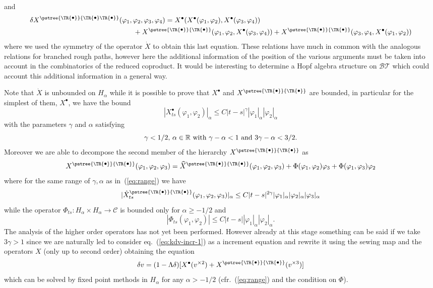 \documentclass[a4paper]{article}
\newcommand{\1}{{\bf 1}}
\newcommand{\der}{\delta}
\newcommand{\RR}{\mathbb{R}}
\newcommand{\CC}{\mathcal{C}}
\newcommand{\BT}{\mathcal{BT}}
\newcommand{\troot}{\bullet}
\newcommand{\tsnode}{\TR{\raisebox{0.5pt}{\ensuremath{\scriptstyle\bullet}}}}
\newcommand{\tsroot}{\ensuremath{\scriptstyle\bullet}}
\newcommand{\aabb}{\pstree{\tsnode}{\tsnode}}
\newcommand{\aababb}{\pstree{\tsnode}{\tsnode \tsnode}}
\newcommand{\CC}{\mathcal{C}}
\newcommand{\RR}{\mathbb{R}}
\newcommand{\der}{\delta}
\begin{document}
and
\begin{equation*}
  \begin{split}
\der X^{\aababb}& (\varphi_1,\varphi_2,\varphi_3,\varphi_4) =
X^{\tsroot}(X^{\tsroot}(\varphi_1,\varphi_2),X^{\tsroot}(\varphi_3,\varphi_4))
\\ & \qquad +
X^{\aabb}(\varphi_1,\varphi_2,X^{\tsroot}(\varphi_3,\varphi_4)) + 
X^{\aabb}(\varphi_3,\varphi_4,X^{\tsroot}(\varphi_1,\varphi_2))    
  \end{split}
\end{equation*}
where we used the symmetry of the operator $\dot X$ to obtain this
last equation. These relations have much in common with the analogous
relations for branched rough paths, however here the additional
information of the position of the various arguments must be taken
into account in the combinatorics of the reduced coproduct. It would
be interesting to determine  a Hopf algebra structure  on $\BT$
which could account this additional information in a general way. 

Note that $\dot X$ is unbounded on $H_\alpha$ while
it is possible to prove that $X^{\troot}$ and $X^{\aabb}$ are bounded,
in particular for the simplest of them, $X^\troot$, we have the bound
$$
|X^{\troot}_{ts}(\varphi_1,\varphi_2)|_\alpha \le C |t-s|^\gamma
|\varphi_1|_\alpha |\varphi_2|_\alpha 
$$
with the parameters $\gamma$ and $\alpha$ satisfying
\begin{equation}
  \label{eq:range}
\text{$ \gamma < 1/2$, $\alpha \in \RR$ with $\gamma-\alpha< 1$ and
$3 \gamma-\alpha<3/2$.}
\end{equation}
Moreover we are able to decompose the second member of the hierarchy
$X^{\aabb}$ as 
\begin{equation}
\label{eq:decomp-kdv-2}
X^{\aabb}(\varphi_1,\varphi_2,\varphi_3)  = {\widehat X}^{\aabb}(\varphi_1,\varphi_2,\varphi_3)+\Phi(\varphi_1,\varphi_2)\varphi_3+\Phi(\varphi_1,\varphi_3)\varphi_2
\end{equation}
where for the same range of $\gamma,\alpha$ as in~(\ref{eq:range}) we have
$$
|\hat X^{\aabb}_{ts}(\varphi_1,\varphi_2,\varphi_3)|_\alpha \le C |t-s|^{2\gamma}
|\varphi_1|_\alpha |\varphi_2|_\alpha |\varphi_3|_\alpha 
$$
while the operator $\Phi_{ts} : H_\alpha \times H_\alpha \to \CC$ is bounded only for $\alpha \ge -1/2$ and
$$
|\Phi_{ts}(\varphi_1,\varphi_2)| \le C |t-s| |\varphi_1|_\alpha |\varphi_2|_\alpha .
$$
The analysis of the higher order operators has not yet been
performed. However already at this stage something can be said if we
take $3\gamma > 1$ since we
 are naturally led to consider
eq.~(\ref{eq:kdv-incr-1}) as a increment equation and rewrite it
using the sewing map and  the operators $X$ (only up to second order) obtaining the equation
\begin{equation}
  \label{eq:lambda-kdv}
\der v = (1-\Lambda \der)[X^{\tsroot}(v^{\times 2}) + X^{\aabb}(v^{\times 3})]  
\end{equation}
which  can be solved by fixed point methods in $H_\alpha$ for any
$\alpha > -1/2$ (cfr.~(\ref{eq:range}) and the condition on $\Phi$).
\end{document}

